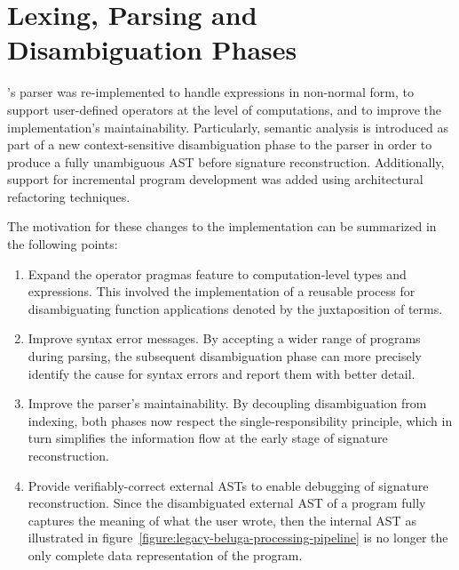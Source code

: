 


\section{\Beluga Lexing, Parsing and Disambiguation Phases}

\Beluga's parser was re-implemented to handle expressions in non-normal form, to support user-defined operators at the level of computations, and to improve the implementation's maintainability.
Particularly, semantic analysis is introduced as part of a new context-sensitive disambiguation phase to the parser in order to produce a fully unambiguous \ac{AST} before signature reconstruction.
Additionally, support for incremental program development was added using architectural refactoring techniques.

The motivation for these changes to the implementation can be summarized in the following points:
\begin{enumerate}
\item
Expand the operator pragmas feature to computation-level types and expressions.
This involved the implementation of a reusable process for disambiguating function applications denoted by the juxtaposition of terms.
\item
Improve syntax error messages.
By accepting a wider range of programs during parsing, the subsequent disambiguation phase can more precisely identify the cause for syntax errors and report them with better detail.
\item
Improve the parser's maintainability.
By decoupling disambiguation from indexing, both phases now respect the single-responsibility principle, which in turn simplifies the information flow at the early stage of signature reconstruction.
\item
Provide verifiably-correct external \acp{AST} to enable debugging of signature reconstruction.
Since the disambiguated external \ac{AST} of a program fully captures the meaning of what the user wrote, then the internal \ac{AST} as illustrated in figure~\ref{figure:legacy-beluga-processing-pipeline} is no longer the only complete data representation of the program.
\end{enumerate}


